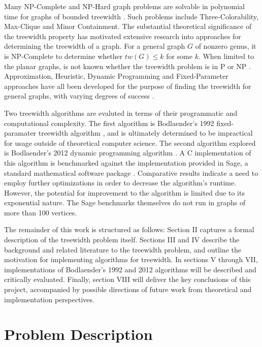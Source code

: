 \documentclass[12pt,conference]{IEEEtran}
\theoremstyle{plain}
\begin{document}
Many NP-Complete and NP-Hard graph problems are solvable in polynomial time for graphs of bounded treewidth \cite{bodlaender-treewidth-power}. Such problems include Three-Colorability, Max-Clique and Minor Containment. The substantial theoretical significance of the treewidth property has motivated extensive research into approaches for determining the treewidth of a graph. For a general graph $G$ of nonzero genus, it is NP-Complete to determine whether $tw(G) \leq k$ for some $k$. When limited to the planar graphs, is not known whether the treewidth problem is in P or NP \cite{planar-treewidth-unsolved}. Approximation, Heuristic, Dynamic Programming and Fixed-Parameter approaches have all been developed for the purpose of finding the treewidth for general graphs, with varying degrees of success \cite{treewidth-survey}. 

Two treewidth algorithms are evaluted in terms of their programmatic and computational complexity. The first algorithm is Bodlaender's 1992 fixed-paramater treewidth algorithm \cite{bodlaender-1992}, and is ultimately determined to be impractical for usage outside of theoretical computer science. The second algorithm explored is Bodlaender's 2012 dynamic programming algorithm \cite{bodlaender-2012}. A C implementation of this algorithm is benchmarked against the implementation provided in Sage, a standard mathematical software package \cite{sage-original}. Comparative results indicate a need to employ further optimizations in order to decrease the algorithm's runtime. However, the potential for improvement to the algorithm is limited due to its exponential nature. The Sage benchmarks themselves do not run in graphs of more than 100 vertices.

The remainder of this work is structured as follows: Section II captures a formal description of the treewidth problem itself. Sections III and IV describe the background and related literature to the treewidth problem, and outline the motivation for implementing algorithms for treewidth. In sections V through VII, implementations of Bodlaender's 1992 and 2012 algorithms will be described and critically evaluated. Finally, section VIII will deliver the key conclusions of this project, accompanied by possible directions of future work from theoretical and implementation perspectives.

\section{Problem Description}
\end{document}
